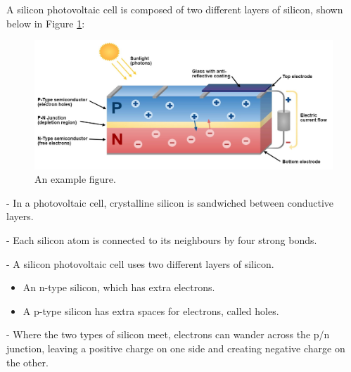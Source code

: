 \noindent A silicon photovoltaic cell is composed of two different layers of silicon, shown below in Figure \ref{fig:photovoltaic_cell_diagram}:

\begin{figure}[h]
    \centering
    \includegraphics[width=1\textwidth]{Figures/photovoltaic_cell_diagram.jpg}
    \caption{An example figure.}
    \label{fig:photovoltaic_cell_diagram}
\end{figure}

\FloatBarrier

\noindent - In a photovoltaic cell, crystalline silicon is sandwiched between conductive layers.\par
\noindent - Each silicon atom is connected to its neighbours by four strong bonds.\par
\noindent - A silicon photovoltaic cell uses two different layers of silicon.\par
\begin{itemize}
    \item An n-type silicon, which has extra electrons.
    \item A p-type silicon has extra spaces for electrons, called holes.
\end{itemize}
\noindent - Where the two types of silicon meet, electrons can wander across the p/n junction, leaving a positive charge on one side and creating negative charge on the other.\par


